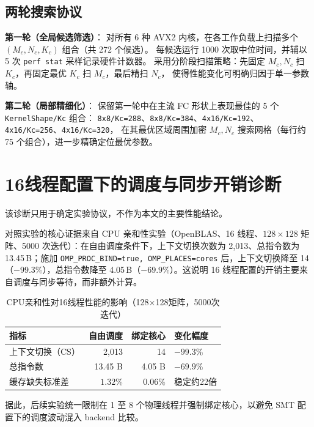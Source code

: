\documentclass[a4paper,11pt,oneside]{article}
\begin{document}
\subsection{两轮搜索协议}

\textbf{第一轮（全局候选筛选）}：
对所有 6 种 AVX2 内核，在各工作负载上扫描多个 $(M_c, N_c, K_c)$ 组合（共 272 个候选）。
每候选运行 1000 次取中位时间，并辅以 5 次 \texttt{perf stat} 采样记录硬件计数器。
采用分阶段扫描策略：先固定 $M_c, N_c$ 扫 $K_c$，再固定最优 $K_c$ 扫 $M_c$，最后精扫 $N_c$，
使得性能变化可明确归因于单一参数轴。

\textbf{第二轮（局部精细化）}：
保留第一轮中在主流 FC 形状上表现最佳的 5 个 \texttt{KernelShape/Kc} 组合：
\texttt{8x8/Kc=288}、\texttt{8x8/Kc=384}、\texttt{4x16/Kc=192}、
\texttt{4x16/Kc=256}、\texttt{4x16/Kc=320}，
在其最优区域周围加密 $M_c, N_c$ 搜索网格（每行约 75 个组合），进一步精确定位最优参数。

\section{16线程配置下的调度与同步开销诊断}\label{app:smt_diagnosis}

该诊断只用于确定实验协议，不作为本文的主要性能结论。

对照实验的核心证据来自 CPU 亲和性实验（OpenBLAS、16 线程、$128\times128$ 矩阵、5000 次迭代）：在自由调度条件下，上下文切换次数为 2{,}013、总指令数为 13.45\,B；施加 \texttt{OMP\_PROC\_BIND=true, OMP\_PLACES=cores} 后，上下文切换降至 14（$-99.3\%$），总指令数降至 4.05\,B（$-69.9\%$）。这说明 16 线程配置的开销主要来自调度与同步等待，而非额外计算。

\begin{table}[H]
\centering
\begin{tabular}{lrrl}
\toprule
\textbf{指标} & \textbf{自由调度} & \textbf{绑定核心} & \textbf{变化幅度} \\
\midrule
上下文切换（CS） & 2{,}013 & 14          & $-99.3\%$ \\
总指令数         & 13.45 B  & 4.05 B      & $-69.9\%$ \\
缓存缺失标准差   & $1.32\%$ & $0.06\%$    & 稳定约22倍 \\
\bottomrule
\end{tabular}
\caption{CPU亲和性对16线程性能的影响（128×128矩阵，5000次迭代）}
\label{tab:affinity_effect}
\end{table}

据此，后续实验统一限制在 1 至 8 个物理线程并强制绑定核心，以避免 SMT 配置下的调度波动混入 backend 比较。
\end{document}

